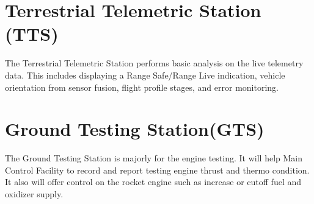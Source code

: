 \documentclass[12pt,article]{memoir}
\begin{document}
\chapter{Terrestrial Telemetric Station (TTS)}
The Terrestrial Telemetric Station performs basic analysis on the live telemetry data. This includes displaying a Range Safe/Range Live indication, vehicle orientation from sensor fusion, flight profile stages, and error monitoring.
\newpage
\chapter{Ground Testing Station(GTS)}
The Ground Testing Station is majorly for the engine testing. It will help Main Control Facility to record and report testing engine thrust and thermo condition. It also will offer control on the rocket engine such as increase or cutoff fuel and oxidizer supply.
\end{document}
